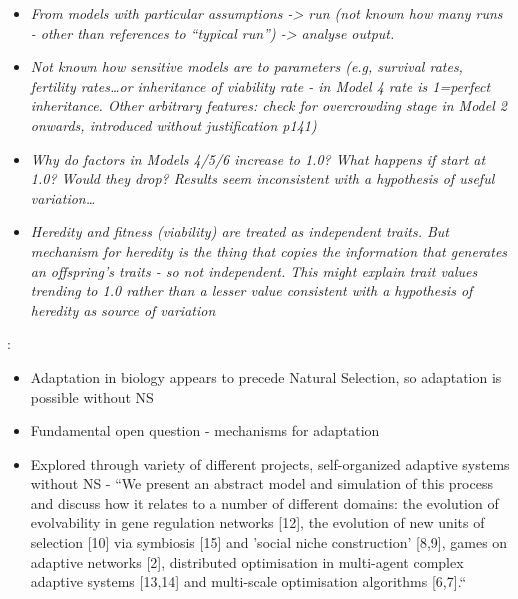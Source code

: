 	
\begin{itemize}
	\item
	
	\emph{From models with particular assumptions -\textgreater{} run
		(not known how many runs - other than references to ``typical run'')
		-\textgreater{} analyse output. }
	
	\item
	
	\emph{Not known how sensitive models are to parameters (e.g,
		survival rates, fertility rates\ldots{}or inheritance of viability
		rate - in Model 4 rate is 1=perfect inheritance. Other arbitrary
		features: check for overcrowding stage in Model 2 onwards,
		introduced without justification p141)}
	
	\item
	
	\emph{Why do factors in Models 4/5/6 increase to 1.0? What happens
		if start at 1.0? Would they drop? Results seem inconsistent with a
		hypothesis of useful variation\ldots{}}
	
	\item
	
	\emph{Heredity and fitness (viability) are treated as independent
		traits. But mechanism for heredity is the thing that copies the
		information that generates an offspring's traits - so not
		independent. This might explain trait values trending to 1.0 rather
		than a lesser value consistent with a hypothesis of heredity as
		source of variation}
	
\end{itemize}
	
\autocite{Watson2010}:

\begin{itemize}
	\item
	
	Adaptation in biology appears to precede Natural Selection, so
	adaptation is possible without NS
	
	\item
	
	Fundamental open question - mechanisms for adaptation
	
	\item
	
	Explored through variety of different projects, self-organized
	adaptive systems without NS - ``We present an abstract model and
	simulation of this process and discuss how it relates to a number of
	different domains: the evolution of evolvability in gene regulation
	networks {[}12{]}, the evolution of new units of selection {[}10{]}
	via symbiosis {[}15{]} and 'social niche construction' {[}8,9{]},
	games on adaptive networks {[}2{]}, distributed optimisation in
	multi-agent complex adaptive systems {[}13,14{]} and multi-scale
	optimisation algorithms {[}6,7{]}.``
	
\end{itemize}

